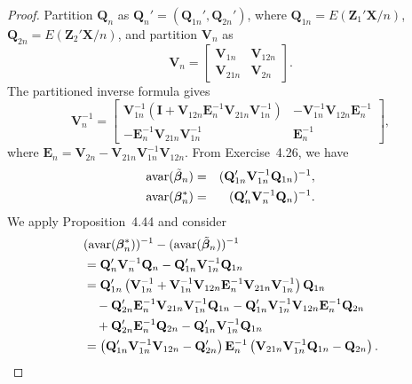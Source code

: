 \begin{proof}
Partition $\mathbf{Q}_n$ as $\mathbf{Q}_n' = (\mathbf{Q}_{1n}', \mathbf{Q}_{2n}')$, where $\mathbf{Q}_{1n} = E(\mathbf{Z}_1'\mathbf{X}/n)$, $\mathbf{Q}_{2n} = E(\mathbf{Z}_2'\mathbf{X}/n)$, and partition $\mathbf{V}_n$ as
\[
\mathbf{V}_n = \begin{bmatrix} \mathbf{V}_{1n} & \mathbf{V}_{12n} \\ \mathbf{V}_{21n} & \mathbf{V}_{2n} \end{bmatrix}.
\]
The partitioned inverse formula gives
\[
\mathbf{V}_n^{-1} = \begin{bmatrix} \mathbf{V}_{1n}^{-1}(\mathbf{I} + \mathbf{V}_{12n}\mathbf{E}_n^{-1}\mathbf{V}_{21n}\mathbf{V}_{1n}^{-1}) & -\mathbf{V}_{1n}^{-1}\mathbf{V}_{12n}\mathbf{E}_n^{-1} \\ -\mathbf{E}_n^{-1}\mathbf{V}_{21n}\mathbf{V}_{1n}^{-1} & \mathbf{E}_n^{-1} \end{bmatrix},
\]
where $\mathbf{E}_n = \mathbf{V}_{2n} - \mathbf{V}_{21n}\mathbf{V}_{1n}^{-1}\mathbf{V}_{12n}$. From Exercise~4.26, we have
\begin{eqnarray*}
\mathrm{avar}(\tilde{\boldsymbol{\beta}}_n) &=& (\mathbf{Q}_{1n}'\mathbf{V}_{1n}^{-1}\mathbf{Q}_{1n})^{-1},\\
\mathrm{avar}(\boldsymbol{\beta}_n^*) &=& (\mathbf{Q}_n'\mathbf{V}_n^{-1}\mathbf{Q}_n)^{-1}.
\end{eqnarray*}
We apply Proposition~4.44 and consider
\begin{align*}
&(\mathrm{avar}(\boldsymbol{\beta}_n^*))^{-1} - (\mathrm{avar}(\tilde{\boldsymbol{\beta}}_n))^{-1} \\
&= \mathbf{Q}_n'\mathbf{V}_n^{-1}\mathbf{Q}_n - \mathbf{Q}_{1n}'\mathbf{V}_{1n}^{-1}\mathbf{Q}_{1n} \\
&= \mathbf{Q}_{1n}'\left(\mathbf{V}_{1n}^{-1} + \mathbf{V}_{1n}^{-1}\mathbf{V}_{12n}\mathbf{E}_n^{-1}\mathbf{V}_{21n}\mathbf{V}_{1n}^{-1}\right)\mathbf{Q}_{1n} \\
&\quad - \mathbf{Q}_{2n}'\mathbf{E}_n^{-1}\mathbf{V}_{21n}\mathbf{V}_{1n}^{-1}\mathbf{Q}_{1n} - \mathbf{Q}_{1n}'\mathbf{V}_{1n}^{-1}\mathbf{V}_{12n}\mathbf{E}_n^{-1}\mathbf{Q}_{2n} \\
&\quad + \mathbf{Q}_{2n}'\mathbf{E}_n^{-1}\mathbf{Q}_{2n} - \mathbf{Q}_{1n}'\mathbf{V}_{1n}^{-1}\mathbf{Q}_{1n} \\
&= \left(\mathbf{Q}_{1n}'\mathbf{V}_{1n}^{-1}\mathbf{V}_{12n} - \mathbf{Q}_{2n}'\right)\mathbf{E}_n^{-1}\left(\mathbf{V}_{21n}\mathbf{V}_{1n}^{-1}\mathbf{Q}_{1n} - \mathbf{Q}_{2n}\right).
\end{align*}

\end{proof}
